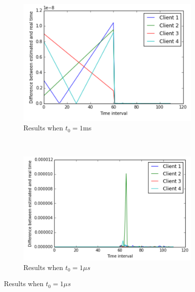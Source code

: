 \documentclass[10pt, journal, letter, onecolumn]{IEEEtran}
\begin{document}
\begin{figure}[h]
\begin{subfigure}[b]{0.45\textwidth}
\centering
\includegraphics[scale=0.5]{figures/figure3}
\caption{Results when $t_0 = 1$ms}
\label{fig:results1_1ms}
\end{subfigure}~
\begin{subfigure}[b]{0.45\textwidth}
\centering
\includegraphics[scale=0.5]{figures/figure4}
\caption{Results when  $t_0 = 1 \mu s$}
\label{fig:results1_1mus}
\end{subfigure}
\label{fig:results1}
\end{figure}
\end{document}
